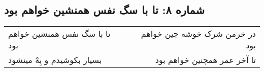 \begin{center}
\section*{شماره ۸: تا با سگ نفس همنشین خواهم بود}
\label{sec:008}
\begin{longtable}{l p{0.5cm} r}
تا با سگ نفس همنشین خواهم بود
&&
در خرمن شرک خوشه چین خواهم بود
\\
بسیار بکوشیدم و بِهْ مینشود
&&
تا آخر عمر همچنین خواهم بود
\\
\end{longtable}
\end{center}
